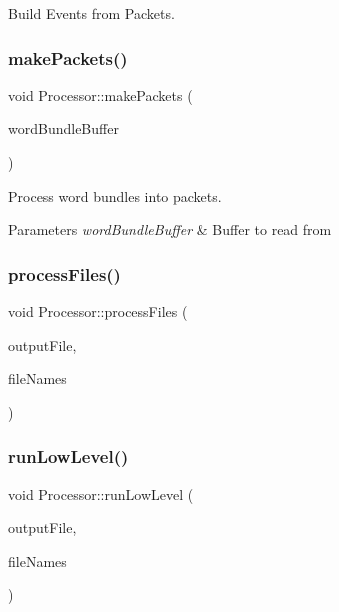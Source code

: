 Build Events from Packets. 

\mbox{\label{class_processor_a554de487c5e8205872151fbedb315291}} 
\subsubsection{\texorpdfstring{make\+Packets()}{makePackets()}}
{\footnotesize\ttfamily void Processor\+::make\+Packets (\begin{DoxyParamCaption}\item[{std\+::shared\+\_\+ptr$<$ \hyperlink{class_processor_a531b4c5f7c0d810fc6e9e1dd3d115725}{bundle\+Buffer} $>$}]{word\+Bundle\+Buffer }\end{DoxyParamCaption})\hspace{0.3cm}{\ttfamily [private]}}



Process word bundles into packets. 


\begin{DoxyParams}{Parameters}
{\em word\+Bundle\+Buffer} & Buffer to read from \\
\hline
\end{DoxyParams}
\mbox{\label{class_processor_ad3862d616c58f790ab6d3e9725ce5b10}} 
\subsubsection{\texorpdfstring{process\+Files()}{processFiles()}}
{\footnotesize\ttfamily void Processor\+::process\+Files (\begin{DoxyParamCaption}\item[{const std\+::string}]{output\+File,  }\item[{const std\+::vector$<$ std\+::string $>$}]{file\+Names }\end{DoxyParamCaption})}

\mbox{\label{class_processor_abb921abb494ace88b4ef5ba9137f21d2}} 
\subsubsection{\texorpdfstring{run\+Low\+Level()}{runLowLevel()}}
{\footnotesize\ttfamily void Processor\+::run\+Low\+Level (\begin{DoxyParamCaption}\item[{const std\+::string}]{output\+File,  }\item[{const std\+::vector$<$ std\+::string $>$ \&}]{file\+Names }\end{DoxyParamCaption})\hspace{0.3cm}{\ttfamily [private]}}



